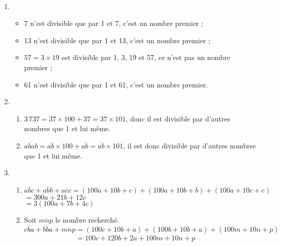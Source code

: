 \ \\ [-5mm]
   \begin{enumerate}
      \item
      \begin{itemize}
         \item 7 n'est divisible que par 1 et 7, c'est un nombre premier ;
         \item 13 n'est divisible que par 1 et 13, c'est un nombre premier ;
         \item $57 =3\times19$ est divisible par 1, 3, 19 et 57, ce n'est pas un nombre premier ;
         \item 61 n'est divisible que par 1 et 61, c'est un nombre premier.
      \end{itemize}
      \item
      \begin{enumerate}
         \item $3\,737 =37\times100+37 =37\times101$, donc il est divisible par d'autres nombres que 1 et lui même. \\
         \item $\overline{abab} =\overline{ab}\times100+\overline{ab} =\overline{ab}\times101$, il est donc divisible par d'autres nombres que 1 et lui même. \\
      \end{enumerate}
      \item
      \begin{enumerate}
         \item $\overline{abc}+\overline{abb}+\overline{acc} =(100a+10b+c)+(100a+10b+b)+(100a+10c+c)$ \\
         \hspace*{3.1cm} $=300a+21b+12c$ \\
         \hspace*{3.1cm} $=3(100a+7b+4c)$ \\
         \item Soit $\overline{mnp}$ le nombre recherché. \\
         $\overline{cba}+\overline{bba}+\overline{mnp} =(100c+10b+a)+(100b+10b+a)+(100m+10n+p)$ \\
         $\phantom{\overline{cba}+\overline{bba}+\overline{mnp}} =100c+120b+2a+100m+10n+p$ \\

\end{enumerate}
\end{enumerate}
